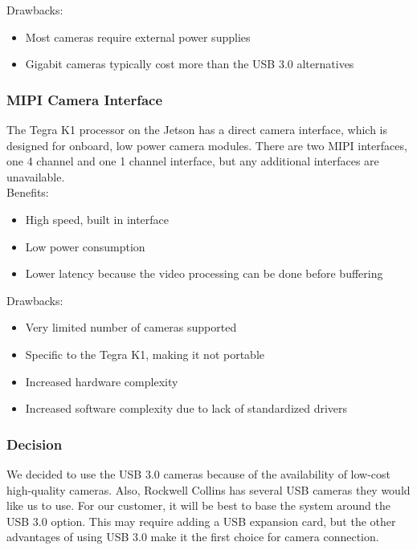 	Drawbacks:
	\begin{itemize}[leftmargin=2cm,labelindent=2cm]
		\item Most cameras require external power supplies
		\item Gigabit cameras typically cost more than the USB 3.0 alternatives\\
	\end{itemize}
	
	\subsubsection{MIPI Camera Interface}
	The Tegra K1 processor on the Jetson has a direct camera interface, which is designed for onboard, low power camera modules. There are two MIPI interfaces, one 4 channel and one 1 channel interface, but any additional interfaces are unavailable.\\
		
	Benefits:
	\begin{itemize}[leftmargin=2cm,labelindent=2cm]
		\item High speed, built in interface
		\item Low power consumption
		\item Lower latency because the video processing can be done before buffering
	\end{itemize}
	
	Drawbacks:
	\begin{itemize}[leftmargin=2cm,labelindent=2cm]
		\item Very limited number of cameras supported
		\item Specific to the Tegra K1, making it not portable
		\item Increased hardware complexity
		\item Increased software complexity due to lack of standardized drivers\\
	\end{itemize}
	
	\subsubsection{Decision}
	We decided to use the USB 3.0 cameras because of the availability of low-cost high-quality cameras. Also, Rockwell Collins has several USB cameras they would like us to use. For our customer, it will be best to base the system around the USB 3.0 option. This may require adding a USB expansion card, but the other advantages of using USB 3.0 make it the first choice for camera connection.
	
